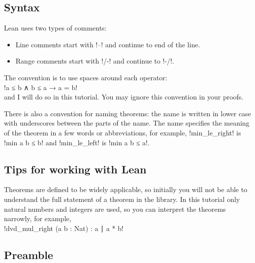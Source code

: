 \subsection*{Syntax}

Lean uses two types of comments: 
\begin{itemize}
\item Line comments start with !--! and continue to end of the line.
\item Range comments start with !/-! and continue to !-/!.
\end{itemize}

The convention is to use spaces around each operator:\\
\indnt{}!a ≤ b ∧ b ≤ a → a = b!\\
and I will do so in this tutorial. You may ignore this convention in your proofs.

There is also a convention for naming theorems: the name is written in lower case with underscores between the parts of the name. The name specifies the meaning of the theorem in a few words or abbreviations, for example, !min_le_right! is !min a b ≤ b! and !min_le_left! is !min a b ≤ a!.

\subsection*{Tips for working with Lean}




Theorems are defined to be widely applicable, so initially you will not be able to understand the full statement of a theorem in the library. In this tutorial only natural numbers and integers are used, so you can interpret the theorems narrowly, for example,\\
\indnt{}!dvd_mul_right (a b : Nat) : a ∣ a * b!

\subsection*{Preamble}

